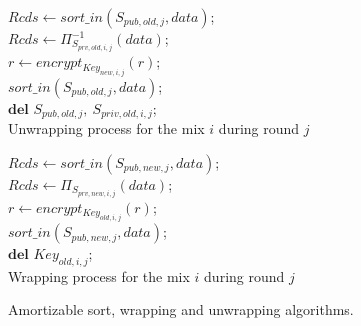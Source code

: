 \documentclass{llncs}
\begin{document}
\begin{figure}
\begin{minipage}[t]{0.475\textwidth}
\vspace{0pt}
\centering 
\begin{algorithm}[H]
\DontPrintSemicolon
{}
$Rcds \gets sort\_in(S_{pub,old,j}, data)$;\\
$Rcds \gets {\Pi}_{S_{prv,old,i,j}}^{-1} (data)$;\\
{
	$r \gets encrypt_{Key_{new,i,j}}\left( r \right )$;\\
}
$sort\_in(S_{pub,old,j}, data)$;\\
$\textbf{del } S_{pub,old,j},\ S_{priv,old,i,j}$;\\
\caption{Unwrapping process for the mix $i$ during round $j$}
\label{alg:UAS}
\end{algorithm}
\end{minipage}
\hfill
\begin{minipage}[t]{0.475\textwidth}
\vspace{0pt}
\centering
\begin{algorithm}[H]
\DontPrintSemicolon
{}
$Rcds \gets sort\_in(S_{pub,new,j}, data)$;\\
$Rcds \gets {\Pi}_{S_{prv,new,i,j}} (data)$;\\
{
	$r \gets encrypt_{Key_{old,i,j}}\left( r \right )$;\\
}
$sort\_in(S_{pub,new,j}, data)$;\\
$\textbf{del } Key_{old,i,j}$;\\
\caption{Wrapping process for the mix $i$ during round $j$}
\label{alg:WAS}
\end{algorithm}
\end{minipage}
\caption{Amortizable sort, wrapping and unwrapping algorithms.}
\end{figure}
\end{document}
